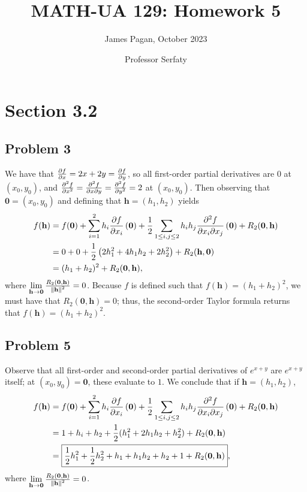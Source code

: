 \documentclass[11pt]{article}
\title{MATH-UA 129: Homework 5}
\author{James Pagan, October 2023}
\date{Professor Serfaty}
\renewcommand{\vec}[1]{\mathbf{#1}}
\begin{document}
\maketitle
\tableofcontents


\section{Section 3.2}


\subsection{Problem 3}

We have that $\pdv{f}{x} = 2x + 2y = \pdv{f}{y}$, so all first-order partial derivatives are $0$ at $(x_{0}, y_{0})$, and $\pdv[2]{f}{x} = \pdv[2]{f}{x}{y} = \pdv[2]{f}{y} = 2$ at $(x_{0}, y_{0})$. Then observing that $\vec{0} = (x_{0}, y_{0})$ and defining that $\vec{h} = (h_{1}, h_{2})$ yields
\begin{align*}
	f(\vec{h}) &= f(\vec{0}) + \sum_{i = 1}^{2} h_{i} \pdv{f}{x_{i}} \left( \vec{0} \right) + \frac{1}{2} \sum_{1 \le i, j \le 2} h_{i} h_{j} \pdv[2]{f}{x_{i}}{x_{j}} \left( \vec{0} \right) + R_{2}(\vec{0}, \vec{h}) \\
	&= 0 + 0 + \frac{1}{2} \left( 2 h_{1}^{2} + 4 h_{1}h_{2} + 2h_{2}^{2} \right) + R_{2}(\vec{h}, \vec{0}) \\
	&= (h_{1} + h_{2})^{2} + R_{2}(\vec{0}, \vec{h}),
\end{align*}
where $\lim\limits_{\vec{h} \to \vec{0}} \frac{R_{2}(\vec{0}, \vec{h})}{\norm{\vec{h}}^{2}} = 0$. Because $f$ is defined such that $f(\vec{h}) = (h_{1} + h_{2})^{2}$, we must have that $R_{2}(\vec{0}, \vec{h}) = 0$; thus, the second-order Taylor formula returns that $\boxed{f(\vec{h}) = (h_{1} + h_{2})^{2}}$.


\subsection{Problem 5} 

Observe that all first-order and second-order partial derivatives of $e^{x + y}$ are $e^{x + y}$ itself; at $(x_{0}, y_{0}) = \vec{0}$, these evaluate to $1$. We conclude that if $\vec{h} = (h_{1}, h_{2})$,
\begin{align*}
	f(\vec{h}) &= f(\vec{0}) + \sum_{i = 1}^{2} h_{i} \pdv{f}{x_{i}} \left( \vec{0} \right) + \frac{1}{2} \sum_{1 \le i, j \le 2} h_{i} h_{j} \pdv[2]{f}{x_{i}}{x_{j}} \left( \vec{0} \right) + R_{2}(\vec{0}, \vec{h}) \\
	&= 1 + h_{i} + h_{2} + \frac{1}{2} (h_{1}^{2} + 2h_{1}h_{2} + h_{2}^{2}) + R_{2}(\vec{0}, \vec{h}) \\
	&= \boxed{\frac{1}{2}h_{1}^{2} + \frac{1}{2}h_{2}^{2} + h_{1} + h_{1}h_{2} + h_{2} + 1 + R_{2}(\vec{0}, \vec{h})},
\end{align*}
where $\lim\limits_{\vec{h} \to \vec{0}} \frac{R_{2}(\vec{0}, \vec{h})}{\norm{\vec{h}}^{2}}= 0$. 
\end{document}
